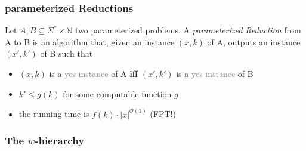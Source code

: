 \subsubsection{parameterized Reductions}
\begin{definition} Let $A,B\subseteq \Sigma^*\times\mathbb{N}$ two parameterized problems. A \textit{parameterized Reduction} from A to B is an algorithm that, given an instance $(x,k)$ of A, outputs an instance $(x', k')$ of B such that

    \begin{itemize}
        \item $(x,k)$ is a \textcolor{gray}{yes instance} of A \textbf{iff} $(x',k')$ is a \textcolor{gray}{yes instance} of B
        \item $k' \leq g(k)$ for some computable function $g$
        \item the running time is $f(k)\cdot |x|^{\mathcal{O}(1)}$ (FPT!)
    \end{itemize}
\end{definition}
    \subsubsection{The $w$-hierarchy}

